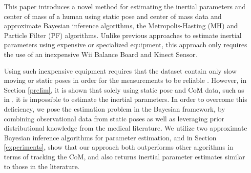 This paper introduces a novel method for estimating the inertial parameters and center of mass of a human using static pose and center of mass data and approximate Bayesian inference algorithms, the Metropolis-Hasting (MH) and Particle Filter (PF) algorithms. Unlike previous approaches to estimate inertial parameters using expensive or specialized equipment, this approach only requires the use of an inexpensive Wii Balance Board and Kinect Sensor. 

Using such inexpensive equipment requires that the dataset contain only slow moving or static poses in order for the measurements to be reliable \cite{gonzalez2012estimation}.
However, in Section \ref{prelim}, it is shown that solely using static pose and CoM data, such as in \cite{gonzalez2012estimation}, it is impossible to estimate the inertial parameters.  
In order to overcome this deficiency, we pose the estimation problem in the Bayesian framework, by combining observational data from static poses as well as leveraging prior distributional knowledge from the medical literature.
We utilize two approximate Bayesian inference algorithms for parameter estimation, and in Section \ref{experiments}, show that our approach both outperforms other algorithms in terms of tracking the CoM, and also returns inertial parameter estimates similar to those in the literature.%



